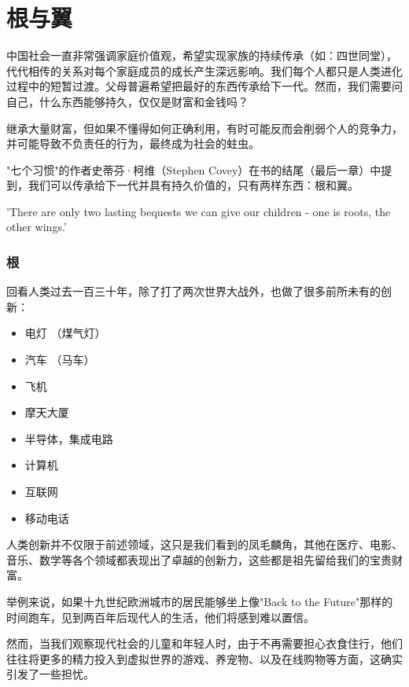 \chapter{根与翼} %

中国社会一直非常强调家庭价值观，希望实现家族的持续传承（如：四世同堂），代代相传的关系对每个家庭成员的成长产生深远影响。我们每个人都只是人类进化过程中的短暂过渡。父母普遍希望把最好的东西传承给下一代。然而，我们需要问自己，什么东西能够持久，仅仅是财富和金钱吗？

继承大量财富，但如果不懂得如何正确利用，有时可能反而会削弱个人的竞争力，并可能导致不负责任的行为，最终成为社会的蛀虫。

"七个习惯"的作者史蒂芬·柯维（Stephen
Covey）在书的结尾（最后一章）中提到，我们可以传承给下一代并具有持久价值的，只有两样东西：根和翼。

'There are only two lasting bequests we can give our children - one is
roots, the other wings.'

\hypertarget{ux6839}{%
\subsection{根}\label{ux6839}}

回看人类过去一百三十年，除了打了两次世界大战外，也做了很多前所未有的创新：

\begin{itemize}
\tightlist
\item
  电灯 （煤气灯）
\item
  汽车 （马车）
\item
  飞机
\item
  摩天大厦
\item
  半导体，集成电路
\item
  计算机
\item
  互联网
\item
  移动电话
\end{itemize}

人类创新并不仅限于前述领域，这只是我们看到的凤毛麟角，其他在医疗、电影、音乐、数学等各个领域都表现出了卓越的创新力，这些都是祖先留给我们的宝贵财富。

举例来说，如果十九世纪欧洲城市的居民能够坐上像"Back to the
Future"那样的时间跑车，见到两百年后现代人的生活，他们将感到难以置信。

然而，当我们观察现代社会的儿童和年轻人时，由于不再需要担心衣食住行，他们往往将更多的精力投入到虚拟世界的游戏、养宠物、以及在线购物等方面，这确实引发了一些担忧。

